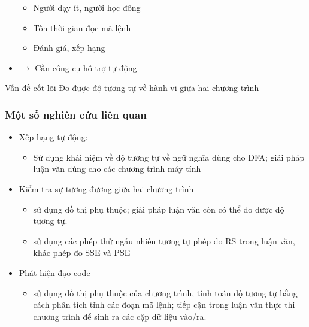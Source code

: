 \documentclass{beamer}
\begin{document}
\begin{frame}
\begin{minipage}{0.59\linewidth}
\begin{itemize}
      \begin{itemize}
      \item Người dạy ít, người học đông
      \item Tốn thời gian đọc mã lệnh
      \item Đánh giá, xếp hạng
      \end{itemize} \pause
    \item $\rightarrow$ Cần công cụ hỗ trợ tự động
    \end{itemize} \pause
  \end{minipage}
  \begin{block}{Vấn đề cốt lõi}
    Đo được độ tương tự về hành vi giữa hai chương trình
  \end{block}
\end{frame}

\begin{frame}
  \frametitle{Một số nghiên cứu liên quan}
  \begin{itemize}
  \item Xếp hạng tự động: \cite{alur2013automated}
    \begin{itemize}
    \item Sử dụng khái niệm về độ tương tự về
      ngữ nghĩa dùng cho DFA; giải pháp luận văn
      dùng cho các chương trình máy tính
    \end{itemize}
  \item Kiểm tra sự tương đương giữa hai chương trình
    \begin{itemize}
    \item \cite{bates1993incremental} sử dụng đồ thị phụ thuộc; giải
      pháp luận văn còn có thể đo được độ tương tự.
    \item \cite{jiang2009automatic} sử dụng các phép thử ngẫu nhiên
      tương tự phép đo RS trong luận văn, khác phép đo SSE và PSE
    \end{itemize}
  \item Phát hiện đạo code
    \begin{itemize}
    \item \cite{komondoor2001using} sử dụng đồ thị phụ thuộc của
      chương trình, tính toán độ tương tự bằng cách phân tích tĩnh các
      đoạn mã lệnh; tiếp cận trong luận văn thực thi chương trình để
      sinh ra các cặp dữ liệu vào/ra.
    \end{itemize}
  \end{itemize}

\end{frame}
\end{document}

